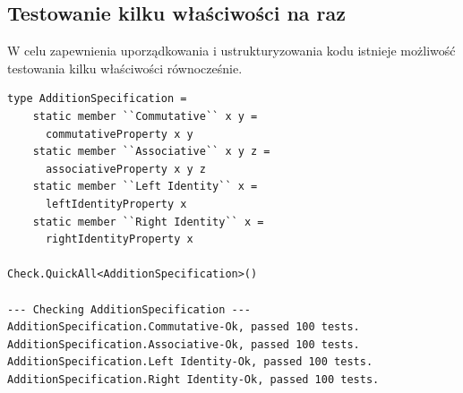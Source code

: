 \subsection{Testowanie kilku właściwości na raz}
W celu zapewnienia uporządkowania i ustrukturyzowania kodu istnieje możliwość testowania kilku właściwości równocześnie.
\lstset{language=FSharp, basicstyle=\scriptsize}
\begin{lstlisting}[frame=single,caption={Sprawdzanie wielu właściwości jednocześnie},label=kod:listingA]
type AdditionSpecification =
    static member ``Commutative`` x y =
      commutativeProperty x y
    static member ``Associative`` x y z =
      associativeProperty x y z
    static member ``Left Identity`` x =
      leftIdentityProperty x
    static member ``Right Identity`` x =
      rightIdentityProperty x
  
Check.QuickAll<AdditionSpecification>()

--- Checking AdditionSpecification ---
AdditionSpecification.Commutative-Ok, passed 100 tests.
AdditionSpecification.Associative-Ok, passed 100 tests.
AdditionSpecification.Left Identity-Ok, passed 100 tests.
AdditionSpecification.Right Identity-Ok, passed 100 tests.
\end{lstlisting}
